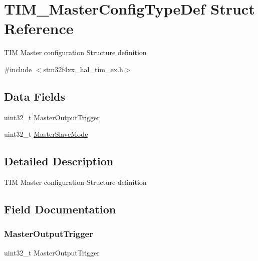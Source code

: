 \hypertarget{struct_t_i_m___master_config_type_def}{}\section{T\+I\+M\+\_\+\+Master\+Config\+Type\+Def Struct Reference}
\label{struct_t_i_m___master_config_type_def}


T\+IM Master configuration Structure definition ~\newline
  




{\ttfamily \#include $<$stm32f4xx\+\_\+hal\+\_\+tim\+\_\+ex.\+h$>$}

\subsection*{Data Fields}
\begin{DoxyCompactItemize}
\item 
uint32\+\_\+t \mbox{\hyperlink{struct_t_i_m___master_config_type_def_aafb70c2c7a9a93a3dad59a350df2b00f}{Master\+Output\+Trigger}}
\item 
uint32\+\_\+t \mbox{\hyperlink{struct_t_i_m___master_config_type_def_aa17903ecbee15ce7a6d51de5e9602d3f}{Master\+Slave\+Mode}}
\end{DoxyCompactItemize}


\subsection{Detailed Description}
T\+IM Master configuration Structure definition ~\newline
 

\subsection{Field Documentation}
\mbox{\label{struct_t_i_m___master_config_type_def_aafb70c2c7a9a93a3dad59a350df2b00f}} 
\subsubsection{\texorpdfstring{Master\+Output\+Trigger}{MasterOutputTrigger}}
{\footnotesize\ttfamily uint32\+\_\+t Master\+Output\+Trigger}

